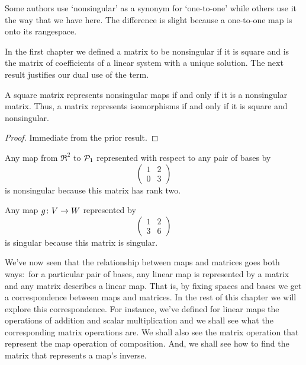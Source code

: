\begin{remark}
Some authors use `nonsingular' as a synonym for `one-to-one'  
while others use it the way that we have here.
The difference is slight because a one-to-one map is onto its
rangespace.
\end{remark}

In the first chapter we defined a matrix to be nonsingular 
if it is square and is
the matrix of coefficients of a linear system with a unique solution.
The next result justifies our dual use of the term.

\begin{corollary} \label{cor:NonsingMatIffNonsingMap}
A square matrix represents nonsingular maps if and only if it is a nonsingular
matrix.
Thus, a matrix represents isomorphisms if and only if it is square and
nonsingular. 
\end{corollary}

\begin{proof}
Immediate from the prior result.
\end{proof}

\begin{example}
Any map from \( \Re^2 \) to \( \mathcal{P}_1 \) represented 
with respect to any pair of bases by
\begin{equation*}
  \begin{pmatrix}
     1  &2  \\
     0  &3  
  \end{pmatrix}
\end{equation*}
is nonsingular because this matrix has rank two.
\end{example}

\begin{example} \label{ex:NonSMatHasNonSMap}
Any map \( \mbox{$g\colon V\to W$} \) represented by
\begin{equation*}
  \begin{pmatrix}
    1  &2  \\
    3  &6
  \end{pmatrix}
\end{equation*}
is singular because this matrix is singular.
\end{example}

We've now seen that the relationship between maps and 
matrices goes both ways:~for a particular pair of bases, 
any linear map is represented by a
matrix and any matrix describes a linear map.
That is, by fixing spaces and bases we get
a correspondence between maps and matrices.
In the rest of this chapter we will explore this correspondence.
For instance, we've defined for linear maps the operations of addition 
and scalar multiplication and we shall see what the corresponding matrix 
operations are.
We shall also see the matrix operation that represent the map operation
of composition.
And, we shall see how to find the matrix that represents a map's inverse.


